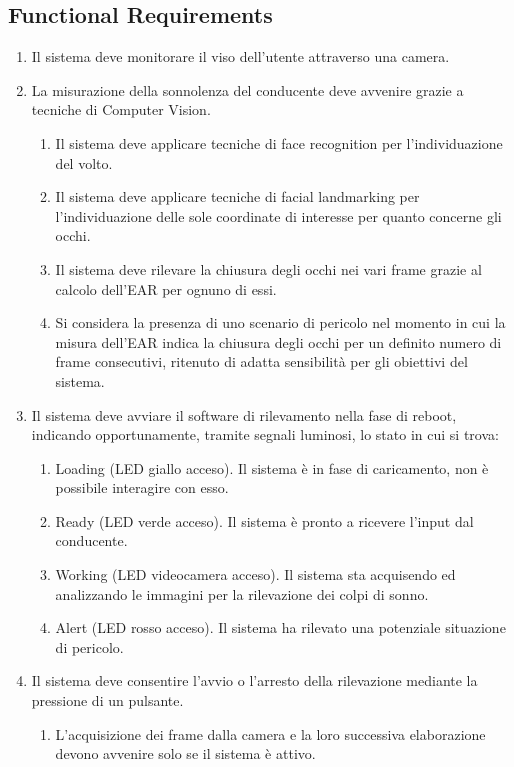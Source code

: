 \documentclass[12pt]{article}
\begin{document}
\subsection{Functional Requirements}
\begin{enumerate}
	\item Il sistema deve monitorare il viso dell'utente attraverso una camera.
	\item La misurazione della sonnolenza del conducente deve avvenire grazie a tecniche di Computer Vision.
	\begin{enumerate}
		\item Il sistema deve applicare tecniche di face recognition per l'individuazione del volto.
		\item Il sistema deve applicare tecniche di facial landmarking per l'individuazione delle sole coordinate di interesse per quanto concerne gli occhi.
		\item Il sistema deve rilevare la chiusura degli occhi nei vari frame grazie al calcolo dell'EAR per ognuno di essi.
		\item Si considera la presenza di uno scenario di pericolo nel momento in cui la misura dell'EAR indica la chiusura degli occhi per un definito numero di frame consecutivi, ritenuto di adatta sensibilità per gli obiettivi del sistema.
	\end{enumerate}
	\item Il sistema deve avviare il software di rilevamento nella fase di reboot, indicando opportunamente, tramite segnali luminosi, lo stato in cui si trova:
	\begin{enumerate}		
		\item Loading (LED giallo acceso). Il sistema è in fase di caricamento, non è possibile interagire con esso.
		\item Ready (LED verde acceso). Il sistema è pronto a ricevere l'input dal conducente.
		\item Working (LED videocamera acceso). Il sistema sta acquisendo ed analizzando le immagini per la rilevazione dei colpi di sonno.
		\item Alert (LED rosso acceso). Il sistema ha rilevato una potenziale situazione di pericolo.
	\end{enumerate}
	\item Il sistema deve consentire l'avvio o l'arresto della rilevazione mediante la pressione di un pulsante.
	\begin{enumerate}
		\item L'acquisizione dei frame dalla camera e la loro successiva elaborazione devono avvenire solo se il sistema è attivo.

\end{enumerate}
\end{enumerate}
\end{document}
